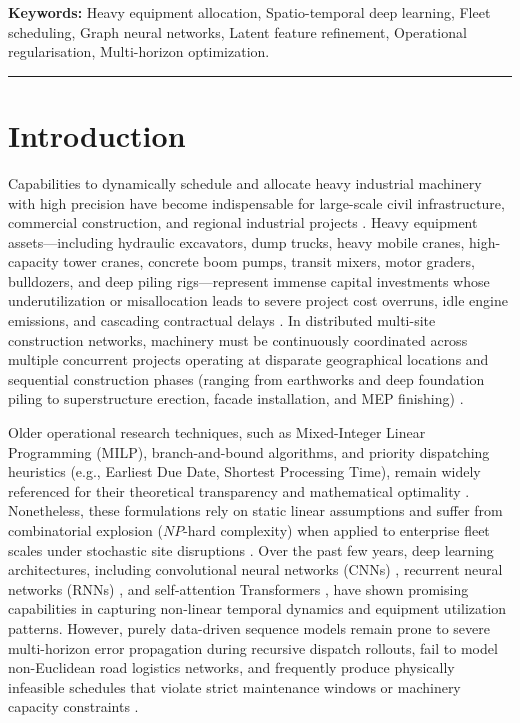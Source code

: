 \documentclass[11pt,a4paper]{article}
\begin{document}
\noindent\textbf{Keywords:} Heavy equipment allocation, Spatio-temporal deep learning, Fleet scheduling, Graph neural networks, Latent feature refinement, Operational regularisation, Multi-horizon optimization.

\vspace{0.8em}
\noindent\rule{\textwidth}{0.4pt}

\section{Introduction}\label{sec:intro}
Capabilities to dynamically schedule and allocate heavy industrial machinery with high precision have become indispensable for large-scale civil infrastructure, commercial construction, and regional industrial projects \cite{hossain2025,russo2025}. Heavy equipment assets---including hydraulic excavators, dump trucks, heavy mobile cranes, high-capacity tower cranes, concrete boom pumps, transit mixers, motor graders, bulldozers, and deep piling rigs---represent immense capital investments whose underutilization or misallocation leads to severe project cost overruns, idle engine emissions, and cascading contractual delays \cite{chiranjeevi2025,inam2024}. In distributed multi-site construction networks, machinery must be continuously coordinated across multiple concurrent projects operating at disparate geographical locations and sequential construction phases (ranging from earthworks and deep foundation piling to superstructure erection, facade installation, and MEP finishing) \cite{inam2025a,inam2025b}.

Older operational research techniques, such as Mixed-Integer Linear Programming (MILP), branch-and-bound algorithms, and priority dispatching heuristics (e.g., Earliest Due Date, Shortest Processing Time), remain widely referenced for their theoretical transparency and mathematical optimality \cite{hossain2025,meng2025}. Nonetheless, these formulations rely on static linear assumptions and suffer from combinatorial explosion ($NP$-hard complexity) when applied to enterprise fleet scales under stochastic site disruptions \cite{wang2025,ejiyi2025}. Over the past few years, deep learning architectures, including convolutional neural networks (CNNs) \cite{russo2025}, recurrent neural networks (RNNs) \cite{chiranjeevi2025}, and self-attention Transformers \cite{inam2025a}, have shown promising capabilities in capturing non-linear temporal dynamics and equipment utilization patterns. However, purely data-driven sequence models remain prone to severe multi-horizon error propagation during recursive dispatch rollouts, fail to model non-Euclidean road logistics networks, and frequently produce physically infeasible schedules that violate strict maintenance windows or machinery capacity constraints \cite{hong2024,park2024}.
\end{document}
